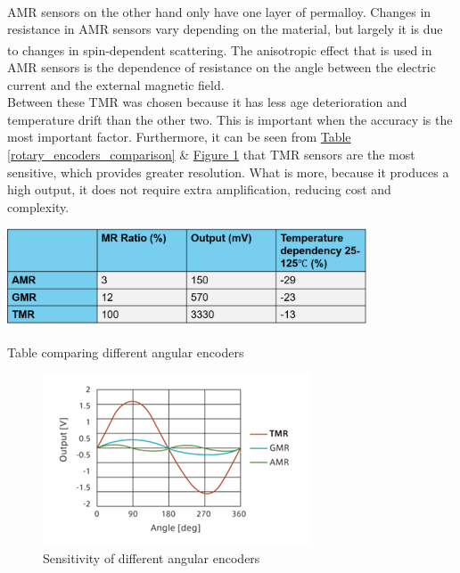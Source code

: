 \documentclass[11pt]{article}		%
\newlength{\imageheight}	 %
\newcommand{\supercite}[1]{\textsuperscript{\cite{#1}}}		%
\newcommand{\figref}[1]{\hyperref[#1]{Figure \ref*{#1}}}    %
\newcommand{\tableref}[1]{\hyperref[#1]{Table \ref*{#1}}}     %
\begin{document}
            \\
            AMR sensors on the other hand only have one layer of permalloy. 
            Changes in resistance in AMR sensors vary depending on the material, but largely it is due to changes in spin-dependent scattering.\supercite{explanation_magntoresistance2}
            The anisotropic effect that is used in AMR sensors is the dependence of resistance on the angle between the electric current and the external magnetic field.
            \\
            Between these TMR was chosen because it has less age deterioration and temperature drift than the other two.
            This is important when the accuracy is the most important factor. 
            Furthermore, it can be seen from \tableref{rotary_encoders_comparison} \& \figref{rotary_encoders_graph} that TMR sensors are the most sensitive, which provides greater resolution. What is more, because it produces a high output, it does not require extra amplification, reducing cost and complexity. 
            
            \begin{table}[h]
					\centering
						\includegraphics[width=0.8\textwidth] {AMR_comparison table_formatted}
						\caption{Table comparing different angular encoders}
						\label{rotary_encoders_comparison}
				\end{table}
				
			    \begin{figure}[h]
					\centering
					\includegraphics[height=\imageheight] {Graph_of_different_rotary_encoders}
					\caption{Sensitivity of different angular encoders \cite{TMR_graph}}
					\label{rotary_encoders_graph}
				\end{figure}
            
\end{document}
